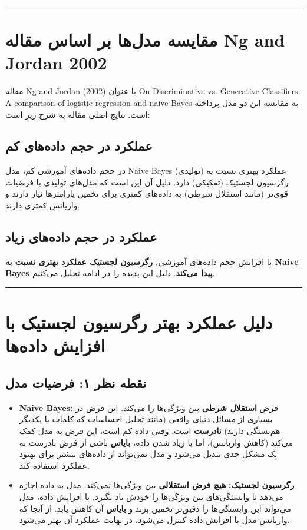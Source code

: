 \documentclass[11pt,a4paper]{article}
\newcommand{\en}[1]{\textenglish{#1}}
\newcommand{\separator}{\vspace{1em}\noindent\rule{\linewidth}{0.4pt}\vspace{1em}}
\begin{document}
\separator
\section{مقایسه مدل‌ها بر اساس مقاله \en{Ng and Jordan 2002}}

مقاله \en{Ng and Jordan (2002)} با عنوان \en{\en{On Discriminative vs. Generative Classifiers: A comparison of logistic regression and naive Bayes}} به مقایسه این دو مدل پرداخته است. نتایج اصلی مقاله به شرح زیر است:

\subsection{عملکرد در حجم داده‌های کم}
در حجم داده‌های آموزشی کم، مدل \en{Naive Bayes} (تولیدی) عملکرد بهتری نسبت به رگرسیون لجستیک (تفکیکی) دارد. دلیل آن این است که مدل‌های تولیدی با فرضیات قوی‌تر (مانند استقلال شرطی) به داده‌های کمتری برای تخمین پارامترها نیاز دارند و واریانس کمتری دارند.

\subsection{عملکرد در حجم داده‌های زیاد}
با افزایش حجم داده‌های آموزشی، \textbf{رگرسیون لجستیک عملکرد بهتری نسبت به \en{Naive Bayes} پیدا می‌کند}. دلیل این پدیده را در ادامه تحلیل می‌کنیم.

\separator
\section{دلیل عملکرد بهتر رگرسیون لجستیک با افزایش داده‌ها}

\subsection{نقطه نظر ۱: فرضیات مدل}

\begin{itemize}
    \item \textbf{\en{Naive Bayes}:} فرض \textbf{استقلال شرطی} بین ویژگی‌ها را می‌کند. این فرض در بسیاری از مسائل دنیای واقعی (مانند تحلیل احساسات که کلمات با یکدیگر هم‌بستگی دارند) \textbf{نادرست} است. وقتی داده کم است، این فرض به مدل کمک می‌کند (کاهش واریانس)، اما با زیاد شدن داده، \textbf{بایاس} ناشی از فرض نادرست به یک مشکل جدی تبدیل می‌شود و مدل نمی‌تواند از داده‌های بیشتر برای بهبود عملکرد استفاده کند.

    \item \textbf{رگرسیون لجستیک:} \textbf{هیچ فرض استقلالی} بین ویژگی‌ها نمی‌کند. مدل به داده اجازه می‌دهد تا وابستگی‌های بین ویژگی‌ها را خودش یاد بگیرد. با افزایش داده، مدل می‌تواند این وابستگی‌ها را دقیق‌تر تخمین بزند و \textbf{بایاس} آن کاهش یابد. از آنجا که واریانس مدل با افزایش داده کنترل می‌شود، در نهایت عملکرد آن بهتر می‌شود.
\end{itemize}
\end{document}

